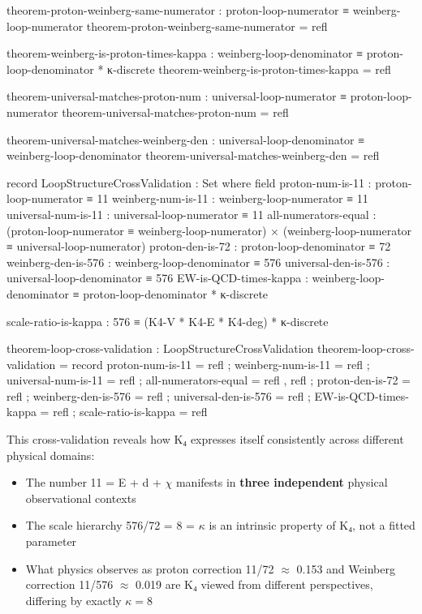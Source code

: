 \documentclass[11pt,a4paper]{book}
\begin{document}
\begin{code}
theorem-proton-weinberg-same-numerator : proton-loop-numerator ≡ weinberg-loop-numerator
theorem-proton-weinberg-same-numerator = refl

theorem-weinberg-is-proton-times-kappa : weinberg-loop-denominator ≡ proton-loop-denominator * κ-discrete
theorem-weinberg-is-proton-times-kappa = refl

theorem-universal-matches-proton-num : universal-loop-numerator ≡ proton-loop-numerator
theorem-universal-matches-proton-num = refl

theorem-universal-matches-weinberg-den : universal-loop-denominator ≡ weinberg-loop-denominator
theorem-universal-matches-weinberg-den = refl

record LoopStructureCrossValidation : Set where
  field
    proton-num-is-11   : proton-loop-numerator ≡ 11
    weinberg-num-is-11 : weinberg-loop-numerator ≡ 11
    universal-num-is-11 : universal-loop-numerator ≡ 11
    all-numerators-equal : (proton-loop-numerator ≡ weinberg-loop-numerator) × 
                           (weinberg-loop-numerator ≡ universal-loop-numerator)
    proton-den-is-72   : proton-loop-denominator ≡ 72
    weinberg-den-is-576 : weinberg-loop-denominator ≡ 576
    universal-den-is-576 : universal-loop-denominator ≡ 576
    EW-is-QCD-times-kappa : weinberg-loop-denominator ≡ proton-loop-denominator * κ-discrete
    
    scale-ratio-is-kappa : 576 ≡ (K4-V * K4-E * K4-deg) * κ-discrete

theorem-loop-cross-validation : LoopStructureCrossValidation
theorem-loop-cross-validation = record
  { proton-num-is-11 = refl
  ; weinberg-num-is-11 = refl
  ; universal-num-is-11 = refl
  ; all-numerators-equal = refl , refl
  ; proton-den-is-72 = refl
  ; weinberg-den-is-576 = refl
  ; universal-den-is-576 = refl
  ; EW-is-QCD-times-kappa = refl
  ; scale-ratio-is-kappa = refl
  }
\end{code}

This cross-validation reveals how K₄ expresses itself consistently across different physical domains:
\begin{itemize}
\item The number 11 = E + d + $\chi$ manifests in \textbf{three independent} physical observational contexts
\item The scale hierarchy 576/72 = 8 = $\kappa$ is an intrinsic property of K₄, not a fitted parameter
\item What physics observes as proton correction 11/72 $\approx$ 0.153 and Weinberg correction 11/576 $\approx$ 0.019 are K₄ viewed from different perspectives, differing by exactly $\kappa = 8$
\end{itemize}
\end{document}
